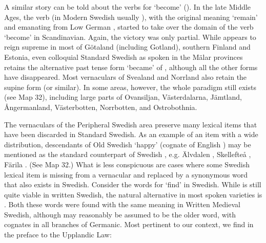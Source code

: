
A similar story can be told about the verbs for ‘become’ (\citet{Markey1969}). In the late Middle Ages, the verb (in Modern Swedish usually ), with the original meaning ‘remain’ and emanating from Low German , started to take over the domain of the verb  ‘become’ in Scandinavian. Again, the victory was only partial. While appears to reign supreme in most of Götaland (including Gotland), southern Finland and Estonia, even colloquial Standard Swedish as spoken in the Mälar provinces retains the alternative past tense form  ‘became’ of , although all the other forms have disappeared. Most vernaculars of Svealand and Norrland also retain the supine form  (or similar). In some areas, however, the whole paradigm still exists (see Map 32), including large parts of Ovansiljan, Västerdalarna, Jämtland, Ångermanland, Västerbotten, Norrbotten, and Ostrobothnia.


The vernaculars of the Peripheral Swedish area preserve many lexical items that have been discarded in Standard Swedish. As an example of an item with a wide distribution, descendants of Old Swedish ‘happy’ (cognate of English ) may be mentioned as the standard counterpart of Swedish , e.g. Älvdalen , Skellefteå , Färila . (See Map 32.) What is less conspicuous are cases where some Swedish lexical item is missing from a vernacular and replaced by a synonymous word that also exists in Swedish. Consider the words for ‘find’ in Swedish. While is still quite viable in written Swedish, the natural alternative in most spoken varieties is . Both these words were found with the same meaning in Written Medieval Swedish, although  may reasonably be assumed to be the older word, with cognates in all branches of Germanic. Most pertinent to our context, we find  in the preface to the Upplandic Law:


